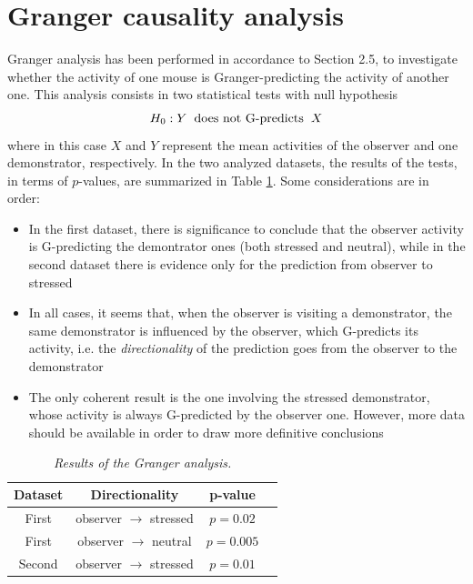\documentclass[12pt, a4paper]{report}
\begin{document}
\section{Granger causality analysis}

Granger analysis has been performed in accordance to Section 2.5, to investigate whether the activity of one mouse is Granger-predicting the activity of another one. This analysis consists in two statistical tests with null hypothesis
$$ H_0:  Y \hspace{0.2cm} \text{does not G-predicts} \hspace{0.2 cm} X $$
where in this case $X$ and $Y$ represent the mean activities of the observer and one demonstrator, respectively. In the two analyzed datasets, the results of the tests, in terms of $p$-values, are summarized in Table \ref{Granger table}. Some considerations are in order:

\begin{itemize}
	\item In the first dataset, there is significance to conclude that the observer activity is G-predicting the demontrator ones (both stressed and neutral), while in the second dataset there is evidence only for the prediction from observer to stressed
	
	\item In all cases, it seems that,  when the observer is visiting a demonstrator, the same demonstrator is influenced by the observer, which G-predicts its activity, i.e. the \textit{directionality} of the prediction goes from the observer to the demonstrator
	
	\item The only coherent result is the one involving the stressed demonstrator, whose activity is always G-predicted by the observer one. However, more data should be available in order to draw more definitive conclusions
\end{itemize}



\begin{table}[H]
	\begin{center}
		\begin{tabular}{ |c|c|c|c| } 
			\hline
			\textbf{Dataset} & \textbf{Directionality} & \textbf{p-value} \\
			\hline
			First & observer $\rightarrow$ stressed & $p = 0.02$ \\ 
			\hline
			First & observer $\rightarrow$ neutral & $p = 0.005$ \\
			\hline
			Second & observer $\rightarrow$ stressed & $p  =  0.01$ \\
			
			\hline
		\end{tabular}
		
	\end{center}
	\caption{\textit{Results of the Granger analysis.}} \label{Granger table}
\end{table}
\end{document}
